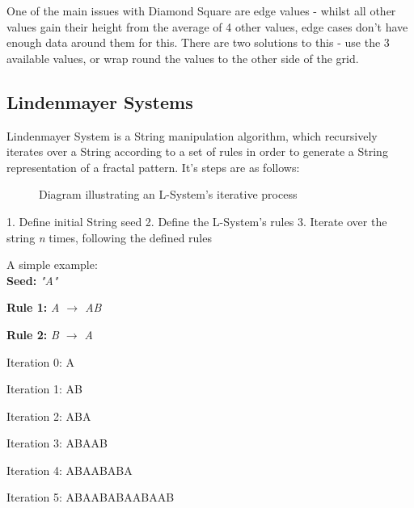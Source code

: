 \documentclass[a4paper,10pt]{report}
\begin{document}
One of the main issues with Diamond Square are edge values - whilst all other values gain their height from the average of 4 other values, edge cases don't have enough data around them for this. There are two solutions to this - use the 3 available values, or wrap round the values to the other side of the grid. 

\subsection{Lindenmayer Systems}

Lindenmayer System is a String manipulation algorithm, which recursively iterates over a String according to a set of rules in order to generate a String representation of a fractal pattern. It's steps are as follows:

\begin{figure}
\centering
 \caption{Diagram illustrating an L-System's iterative process}
 \label{fig:l_system_AB}
\end{figure}

1. Define initial String seed
2. Define the L-System's rules
3. Iterate over the string \textit{n} times, following the defined rules


A simple example:\\

\textbf{Seed:} \textit{"A"}

\textbf{Rule 1:} \textit{A $\rightarrow$ AB}

\textbf{Rule 2:} \textit{B $\rightarrow$ A}


Iteration 0: A

Iteration 1: AB

Iteration 2: ABA

Iteration 3: ABAAB

Iteration 4: ABAABABA

Iteration 5: ABAABABAABAAB\\
\end{document}
